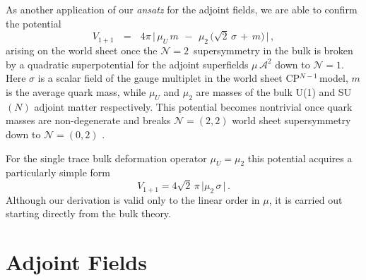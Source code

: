 \documentclass[12pt]{article}
\def\beq{\begin{equation}}
\def\eeq{\end{equation}}
\newcommand{\ntwon}{${\mathcal N}=2$}
\newcommand{\ntwot}{${\mathcal N}= \left(2,2\right) $ }
\newcommand{\ntwoo}{${\mathcal N}= \left(0,2\right) $ }
\newcommand{\ca}{{\mathcal A}}
\newcommand{\cpn}{CP$^{N-1}$\,}
\newcommand{\ansatz}{{\it ansatz} }
\begin{document}
	As another application of our \ansatz for the adjoint fields, we are able to confirm the potential 
\beq
\label{Vmu}
	V_{1+1}    \:~~ = ~~\:
	4\pi\, \Big|\, \mu_U\, m  \,~-~\,  \mu_2\, \big( \sqrt{2}\,\sigma \,+\, m \big) \,\Big|\,,
\eeq
	arising on the world sheet \cite{Shifman:2010kr} 
	once the \ntwon\, supersymmetry in the bulk is broken by a quadratic superpotential for the
	adjoint superfields $ \mu\, \ca^2 $ down to ${\mathcal N}=1$.
	Here $\sigma$ is a scalar field of the gauge multiplet in the world sheet \cpn model, $m$ is the average quark mass,
	while $\mu_U$ and $\mu_2$ are masses of the bulk U(1) and SU$(N)$ adjoint matter respectively. This potential becomes nontrivial once quark masses are non-degenerate and breaks \ntwot world sheet supersymmetry down to 
	\ntwoo. 
	
	For the single trace bulk deformation operator $\mu_U=\mu_2$ this 
	potential acquires a particularly simple form
	\beq
\label{Vmu1}
	V_{1+1}   =
	4\sqrt{2}\,\pi\, \Big|  \mu_2\, \sigma  \,\Big|\,.
\eeq
	Although our derivation is valid only to the linear order in $ \mu $, it is carried out
	starting directly from the bulk theory.









\section{Adjoint Fields}
\end{document}
